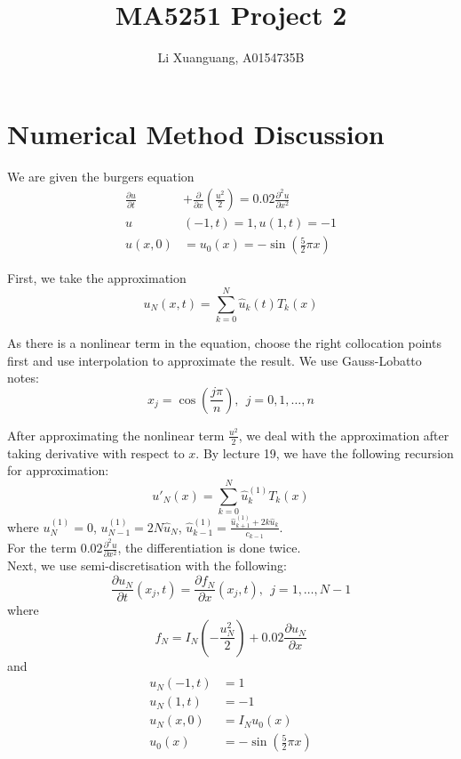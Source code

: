 \documentclass[a4paper,8pt]{article}
\title{MA5251 Project 2}
\author{Li Xuanguang, A0154735B}
\begin{document}
\maketitle

\section{Numerical Method Discussion}

\noindent
We are given the burgers equation
\begin{align} 
\frac{\partial u}{\partial t}& + \frac{\partial}{\partial x}\left(\frac{u^{2}}{2}\right) = 0.02 \frac{\partial^2 u}{\partial x^2} \nonumber \\
u&(-1,t)=1, u(1, t) = -1 \nonumber \\
u(x,0) &= u_0 (x) = -\sin \left(\frac{5}{2} \pi x \right) \nonumber
\end{align}

\noindent
First, we take the approximation 
\begin{equation}
u_N(x,t) = \sum\limits_{k=0}^{N} \hat{u}_k(t) T_k(x) \nonumber
\end{equation}

\noindent
As there is a nonlinear term in the equation, choose the right collocation points first and use interpolation to approximate the result. We use Gauss-Lobatto notes:
\begin{equation}
x_j = \cos \left(\frac{j \pi}{n}\right), \ \ j = 0, 1, \ldots, n \nonumber
\end{equation}

\noindent
After approximating the nonlinear term $\frac{u^2}{2}$, we deal with the approximation after taking derivative with respect to $x$. By lecture 19, we have the following recursion for approximation:
\begin{equation}
u'_N(x) = \sum\limits_{k=0}^{N} \hat{u}_k^{(1)}T_k(x) \nonumber
\end{equation}
where $u^{(1)}_N = 0$, $u^{(1)}_{N-1} = 2N \hat{u}_N$, $\hat{u}^{(1)}_{k-1} = \frac{\hat{u}^{(1)}_{k+1} + 2k \hat{u}_k}{c_{k-1}}$.\\
For the term $0.02 \frac{\partial^2 u}{\partial x^2}$, the differentiation is done twice.\\

\noindent
Next, we use semi-discretisation with the following:
\begin{equation}
\frac{\partial u_N}{\partial t} (x_j, t) = \frac{\partial f_N}{\partial x} (x_j, t), \ \ j = 1, \ldots, N-1 \nonumber
\end{equation}
where
\begin{equation}
f_N = I_N \left(- \frac{u^2_N}{2} \right) + 0.02 \frac{\partial u_N}{\partial x} \nonumber
\end{equation}
and
\begin{align}
u_N(-1,t) &= 1 \nonumber \\
u_N(1,t) &= -1 \nonumber \\
u_N(x,0) &= I_N u_0(x) \nonumber \\
u_0(x) &= -\sin \left(\frac{5}{2} \pi x \right) \nonumber
\end{align}
\end{document}
